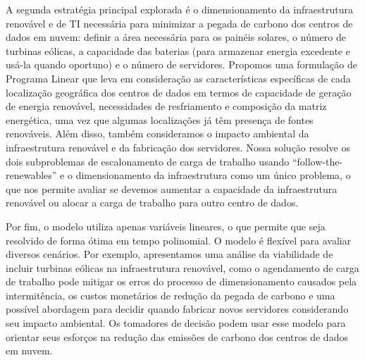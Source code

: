 A segunda estratégia principal explorada é o dimensionamento da infraestrutura renovável e de TI necessária para minimizar a pegada de carbono dos centros de dados em nuvem: definir a área necessária para os painéis solares, o número de turbinas eólicas, a capacidade das baterias (para armazenar energia excedente e usá-la quando oportuno) e o número de servidores. Propomos uma formulação de Programa Linear que leva em consideração as características específicas de cada localização geográfica dos centros de dados em termos de capacidade de geração de energia renovável, necessidades de resfriamento e composição da matriz energética, uma vez que algumas localizações já têm presença de fontes renováveis. Além disso, também consideramos o impacto ambiental da infraestrutura renovável e da fabricação dos servidores. Nossa solução resolve os dois subproblemas de escalonamento de carga de trabalho usando ``follow-the-renewables'' e o dimensionamento da infraestrutura como um único problema, o que nos permite avaliar se devemos aumentar a capacidade da infraestrutura renovável ou alocar a carga de trabalho para outro centro de dados.

Por fim, o modelo utiliza apenas variáveis lineares, o que permite que seja resolvido de forma ótima em tempo polinomial. O modelo é flexível para avaliar diversos cenários. Por exemplo, apresentamos uma análise da viabilidade de incluir turbinas eólicas na infraestrutura renovável, como o agendamento de carga de trabalho pode mitigar os erros do processo de dimensionamento causados pela intermitência, os custos monetários de redução da pegada de carbono e uma possível abordagem para decidir quando fabricar novos servidores considerando seu impacto ambiental. Os tomadores de decisão podem usar esse modelo para orientar seus esforços na redução das emissões de carbono dos centros de dados em nuvem.









